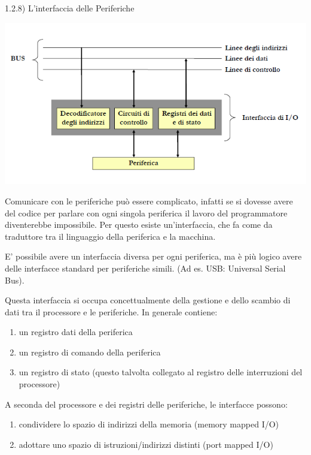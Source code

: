 \documentclass[
  paper=a4,
  oneside  ,captions=tableheading
]{scrbook}
\providecommand{\tightlist}{%
  \setlength{\itemsep}{0pt}\setlength{\parskip}{0pt}}
\begin{document}
1.2.8) L'interfaccia delle Periferiche

\includegraphics{./image/image-20201112230056001.png}

Comunicare con le periferiche può essere complicato, infatti se si
dovesse avere del codice per parlare con ogni singola periferica il
lavoro del programmatore diventerebbe impossibile. Per questo esiste
un'interfaccia, che fa come da traduttore tra il linguaggio della
periferica e la macchina.

E' possibile avere un interfaccia diversa per ogni periferica, ma è più
logico avere delle interfacce standard per periferiche simili. (Ad es.
USB: Universal Serial Bus).

Questa interfaccia si occupa concettualmente della gestione e dello
scambio di dati tra il processore e le periferiche. In generale
contiene:

\begin{enumerate}
\def\labelenumi{\arabic{enumi}.}
\tightlist
\item
  un registro dati della periferica
\item
  un registro di comando della periferica
\item
  un registro di stato (questo talvolta collegato al registro delle
  interruzioni del processore)
\end{enumerate}

A seconda del processore e dei registri delle periferiche, le interfacce
possono:

\begin{enumerate}
\def\labelenumi{\arabic{enumi}.}
\tightlist
\item
  condividere lo spazio di indirizzi della memoria (memory mapped I/O)
\item
  adottare uno spazio di istruzioni/indirizzi distinti (port mapped I/O)
\end{enumerate}
\end{document}
